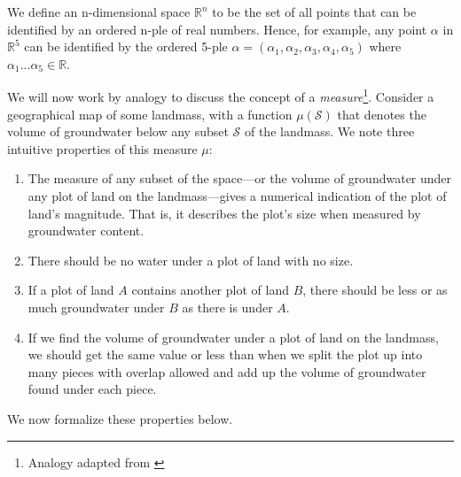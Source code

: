 \begin{mydef}
We define an n-dimensional space $ \mathbb{R}^{n} $ to be the set of all points that can be identified by an ordered n-ple of real numbers. Hence, for example, any point $ \alpha $ in $ \mathbb{R}^{5} $ can be identified by the ordered 5-ple $ \alpha = (\alpha_{1}, \alpha_{2}, \alpha_{3}, \alpha_{4}, \alpha_{5})$ where $ \alpha_{1} ... \alpha_{5} \in \mathbb{R} $.\end{mydef}

We will now work by analogy to discuss the concept of a \textit{measure}\footnote{Analogy adapted from \citep{mandelbrotmultifractal}}. Consider a geographical map of some landmass, with a function $ \mu(\mathcal{S}) $ that denotes the volume of groundwater below any subset $ \mathcal{S} $ of the landmass. We note three intuitive properties of this measure $ \mu $:\begin{enumerate}
\item The measure of any subset of the space---or the volume of groundwater under any plot of land on the landmass---gives a numerical indication of the plot of land's magnitude. That is, it describes the plot's size when measured by groundwater content.
\item\label{measureofanullset} There should be no water under a plot of land with no size. 
\item\label{measureofsubsets} If a plot of land $ A $ contains another plot of land $ B $, there should be less or as much groundwater under $B$ as there is under $A$. 
\item\label{measureaddition} If we find the volume of groundwater under a plot of land on the landmass, we should get the same value or less than when we split the plot up into many pieces with overlap allowed and add up the volume of groundwater found under each piece. 
\end{enumerate}
We now formalize these properties below.


